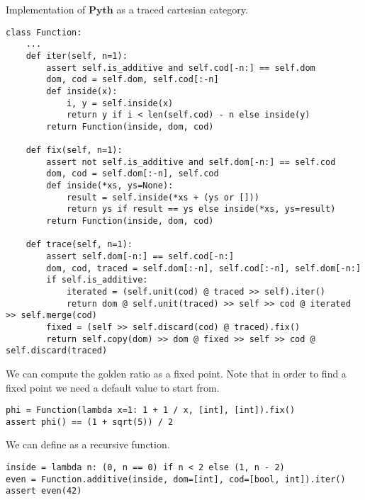 \begin{python}\label{listing:traced-python}
{\normalfont Implementation of $\mathbf{Pyth}$ as a traced cartesian category.}

\begin{verbatim}
class Function:
    ...
    def iter(self, n=1):
        assert self.is_additive and self.cod[-n:] == self.dom
        dom, cod = self.dom, self.cod[:-n]
        def inside(x):
            i, y = self.inside(x)
            return y if i < len(self.cod) - n else inside(y)
        return Function(inside, dom, cod)

    def fix(self, n=1):
        assert not self.is_additive and self.dom[-n:] == self.cod
        dom, cod = self.dom[:-n], self.cod
        def inside(*xs, ys=None):
            result = self.inside(*xs + (ys or []))
            return ys if result == ys else inside(*xs, ys=result)
        return Function(inside, dom, cod)

    def trace(self, n=1):
        assert self.dom[-n:] == self.cod[-n:]
        dom, cod, traced = self.dom[:-n], self.cod[:-n], self.dom[-n:]
        if self.is_additive:
            iterated = (self.unit(cod) @ traced >> self).iter()
            return dom @ self.unit(traced) >> self >> cod @ iterated >> self.merge(cod)
        fixed = (self >> self.discard(cod) @ traced).fix()
        return self.copy(dom) >> dom @ fixed >> self >> cod @ self.discard(traced)
\end{verbatim}
\end{python}

\begin{example}
We can compute the golden ratio as a fixed point.
Note that in order to find a fixed point we need a default value to start from.

\begin{verbatim}
phi = Function(lambda x=1: 1 + 1 / x, [int], [int]).fix()
assert phi() == (1 + sqrt(5)) / 2
\end{verbatim}

We can define  as a recursive function.

\begin{verbatim}
inside = lambda n: (0, n == 0) if n < 2 else (1, n - 2)
even = Function.additive(inside, dom=[int], cod=[bool, int]).iter()
assert even(42)
\end{verbatim}
\end{example}

